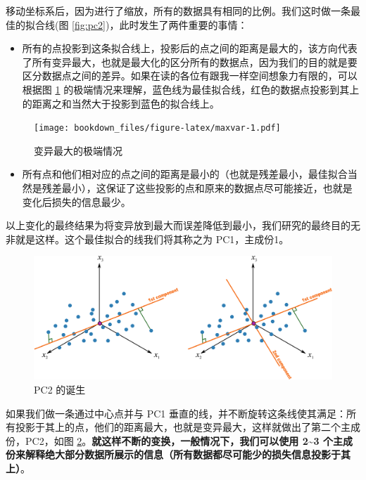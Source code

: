 \documentclass[
]{krantz}
\providecommand{\tightlist}{%
  \setlength{\itemsep}{0pt}\setlength{\parskip}{0pt}}
\begin{document}
移动坐标系后，因为进行了缩放，所有的数据具有相同的比例。我们这时做一条最佳的拟合线(图 \ref{fig:pc2})，此时发生了两件重要的事情：

\begin{itemize}
\tightlist
\item
  所有的点投影到这条拟合线上，投影后的点之间的距离是最大的，该方向代表了所有变异最大，也就是最大化的区分所有的数据点，因为我们的目的就是要区分数据点之间的差异。如果在读的各位有跟我一样空间想象力有限的，可以根据图 \ref{fig:maxvar} 的极端情况来理解，蓝色线为最佳拟合线，红色的数据点投影到其上的距离之和当然大于投影到蓝色的拟合线上。
\end{itemize}

\begin{figure}
\centering
\texttt{[image: bookdown\_files/figure-latex/maxvar-1.pdf]}
\caption{\label{fig:maxvar}变异最大的极端情况}
\end{figure}

\begin{itemize}
\tightlist
\item
  所有点和他们相对应的点之间的距离是最小的（也就是残差最小，最佳拟合当然是残差最小），这保证了这些投影的点和原来的数据点尽可能接近，也就是变化后损失的信息最少。
\end{itemize}

以上变化的最终结果为将变异放到最大而误差降低到最小，我们研究的最终目的无非就是这样。这个最佳拟合的线我们将其称之为 PC1，主成份1。

\begin{figure}
\includegraphics[width=1\linewidth]{images/pc3} \caption{PC2 的诞生}\label{fig:pc3}
\end{figure}

如果我们做一条通过中心点并与 PC1 垂直的线，并不断旋转这条线使其满足：所有投影于其上的点，他们的距离最大，也就是变异最大，这样就做出了第二个主成份，PC2，如图 \ref{fig:pc3}。\textbf{就这样不断的变换，一般情况下，我们可以使用 2\textasciitilde3 个主成份来解释绝大部分数据所展示的信息（所有数据都尽可能少的损失信息投影于其上）}。
\end{document}
